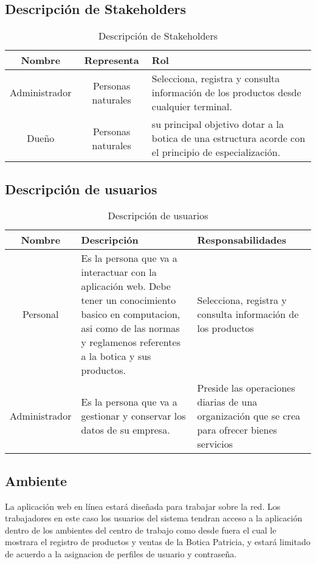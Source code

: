\documentclass[a4paper,11pt, spanish]{report}
\begin{document}
{{      \subsection{Descripción de Stakeholders}
      
        {\renewcommand{\arraystretch}{1.7}%
        \noindent\begin{table}[H]
        \noindent\begin{tabularx}{\textwidth}{c|c|X}
          \textbf{{\large Nombre}} & \textbf{{\large Representa}} & \textbf{{\large Rol}} \\
          \hline
          Administrador & Personas naturales & Selecciona, registra y consulta información de los productos desde cualquier terminal.\\
          Dueño & Personas naturales & su principal objetivo dotar a la botica de una estructura acorde con el principio de especialización.\\
        \end{tabularx}
        \caption{Descripción de Stakeholders}
        \end{table}

      \subsection{Descripción de usuarios}
      
        {\renewcommand{\arraystretch}{1.7}%
        \noindent\begin{table}[H]
        \noindent\begin{tabularx}{\textwidth}{c|X|X}
          \textbf{{\large Nombre}} & \textbf{{\large Descripción}} & \textbf{{\large Responsabilidades}} \\
          \hline
          Personal & Es la persona que va a interactuar con la aplicación web. Debe tener un conocimiento basico en computacion, asi como de las normas y reglamenos referentes a la botica y sus productos. & Selecciona, registra y consulta información de los productos \\
          Administrador & Es la persona que va a gestionar y conservar los datos de su empresa. & Preside las operaciones diarias de una organización que se crea para ofrecer bienes servicios
        \end{tabularx}
        \caption{Descripción de usuarios}
        \end{table}
        
      \subsection{Ambiente}
        La aplicación web en línea estará diseñada para trabajar sobre la red. Los trabajadores
        en este caso los usuarios del sistema tendran acceso a la aplicación dentro de los ambientes del centro
        de trabajo como desde fuera el cual le mostrara el registro de productos y ventas de la Botica Patricia,
        y estará limitado de acuerdo a la asignacion de perfiles de usuario y contraseña.

}}}}
\end{document}
